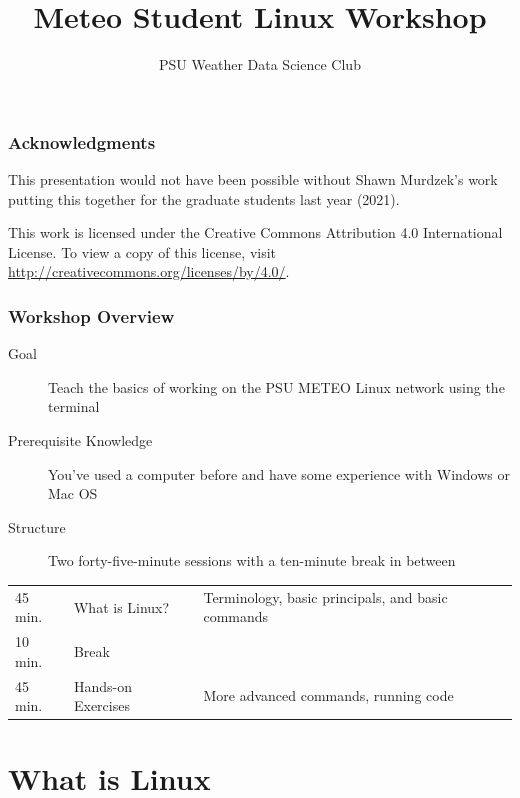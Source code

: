 \documentclass[hyperref,pdfa,unicode,utf8,usepdftitle]{beamer}
\title{Meteo Student Linux Workshop}
\institute{Penn State Department of Meteorology and Atmospheric Science}
\author{PSU Weather Data Science Club}
\begin{document}
\begin{frame}
  \titlepage{}
\end{frame}

\begin{frame}
  \frametitle{Acknowledgments}
  This presentation would not have been possible without Shawn
  Murdzek’s work putting this together for the graduate students last
  year (2021).

  This work is licensed under the Creative Commons Attribution 4.0
  International License. To view a copy of this license, visit
  \url{http://creativecommons.org/licenses/by/4.0/}.
\end{frame}

\begin{frame}
  \frametitle{Workshop Overview}
  \begin{description}
  \item[Goal] Teach the basics of working on the PSU METEO Linux
    network using the terminal
  \item[Prerequisite Knowledge] You've used a computer before and have
    some experience with Windows or Mac OS
  \item[Structure] Two forty-five-minute sessions with a ten-minute break in between
  \end{description}

  \begin{tabular}{ll>{\RaggedRight\arraybackslash\noindent}p{5cm}}
    45 min. & What is Linux? & Terminology, basic principals, and basic commands \\
    10 min. & Break \\
    45 min. & Hands-on Exercises & More advanced commands, running code \\
  \end{tabular}
\end{frame}

\section{What is Linux}
\end{document}
